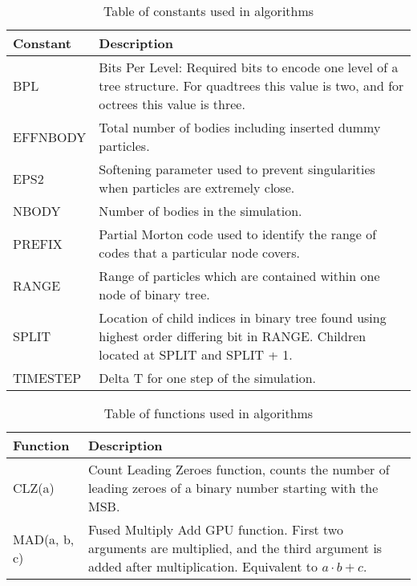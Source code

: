 \documentclass{thesis}
\author{Clayton Rayment}
\begin{document}
 
\titlepage             %
\copyrightpage        %
\tableofcontents       %
\listoftables          %
\listoffigures         %

\begin{table}[!h]
    \centering
    \caption{\label{tab:Constants} Table of constants used in algorithms}
    \begin{tabular}{|p{3cm}|p{10cm}|}
        \hline
        Constant & Description \\
        \hline\hline
        BPL & Bits Per Level: Required bits to encode one level of a tree structure. For quadtrees this value is two, and for octrees this value is three.\\
        \hline
        EFFNBODY & Total number of bodies including inserted dummy particles.\\
        \hline
        EPS2 & Softening parameter used to prevent singularities when particles are extremely close.\\
        \hline
        NBODY & Number of bodies in the simulation.\\
        \hline
        PREFIX & Partial Morton code used to identify the range of codes that a particular node covers.\\
        \hline
        RANGE & Range of particles which are contained within one node of binary tree.\\
        \hline
        SPLIT & Location of child indices in binary tree found using highest order differing bit in RANGE. Children located at SPLIT and SPLIT + 1.\\
        \hline
        TIMESTEP & Delta T for one step of the simulation.\\
        \hline
    \end{tabular}
\end{table}
\begin{table}[!h]
    \centering
    \caption{Table of functions used in algorithms}
    \label{tab:Functions}
    \begin{tabular}{|p{3cm}|p{10cm}|}
        \hline
        Function & Description \\
        \hline\hline
        CLZ(a) & Count Leading Zeroes function, counts the number of leading zeroes of a binary number starting with the MSB.\\
        \hline
        MAD(a, b, c) & Fused Multiply Add GPU function. First two arguments are multiplied, and the third argument is added after multiplication. Equivalent to $a \cdot b + c$.\\
        \hline
    \end{tabular}
\end{table}
\end{document}
